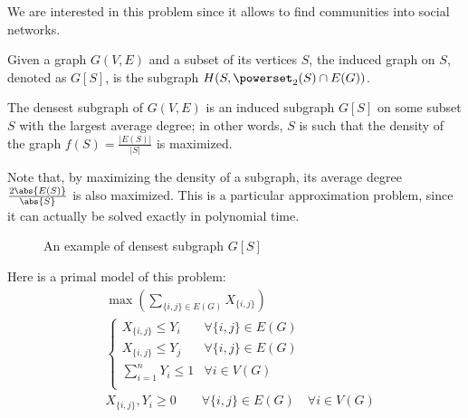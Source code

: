 We are interested in this problem since it allows to find communities into social networks.

\begin{definition}
    Given a graph $G(V, E)$ and a subset of its vertices $S$, the induced graph on $S$, denoted as $G[S]$, is the subgraph $H(S, \powerset_2(S) \cap E(G))$.
\end{definition}

\begin{definition}\label{densest-subgraph}
    The densest subgraph of $G(V, E)$ is an induced subgraph $G[S]$ on some subset $S$ with the largest average degree; in other words, $S$ is such that the density of the graph $f(S) = \frac{|E(S)|}{|S|}$ is maximized.
\end{definition}

Note that, by maximizing the density of a subgraph, its average degree $\frac{2 \abs{E(S)}}{\abs{S}}$ is also maximized. This is a particular approximation problem, since it can actually be solved exactly in polynomial time.

\begin{figure}[ht]
    \centering
    \caption{An example of densest subgraph $G[S]$}
    \label{fig:densest-subgraph}
\end{figure}

Here is a primal \lp{} model of this problem:
\begin{equation}
    \begin{aligned}\label{lp-densest-subgraph}
    &\max \left( \sum_{\{i, j\} \in E(G)}X_{\{i, j\}} \right) \\
    &\begin{cases}
        X_{\{i, j\}} \leq Y_i   & \forall \{i, j\} \in E(G) \\
        X_{\{i, j\}} \leq Y_j   & \forall \{i, j\} \in E(G) \\
        \sum_{i=1}^n Y_i \leq 1 & \forall i \in V(G) \\
    \end{cases} \\
    &X_{\{i, j\}}, Y_i \geq 0  \qquad \forall \{i, j\} \in E(G) \quad \forall i \in V(G)
    \end{aligned}
\end{equation}


